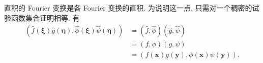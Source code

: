 \begin{Example}
\label{ex:fourier-direct-product}
直积的 Fourier 变换是各 Fourier 变换的直积. 为说明这一点, 只需对一个稠密的试验函数集合证明相等. 有
\begin{equation}\label{eq:fourier-direct-product-separable-proof}
\begin{aligned}
(\widehat f(\bm{\xi})\widehat g(\bm{\eta}),\widehat\phi(\bm{\xi})\widehat\psi(\bm{\eta}))
&=(\widehat f,\widehat\phi)(\widehat g,\widehat\psi)\\
&=(f,\phi)(g,\psi)\\
&=(f(\bm{x})g(\bm{y}),\phi(\bm{x})\psi(\bm{y})).
\end{aligned}
\end{equation}

\end{Example}
